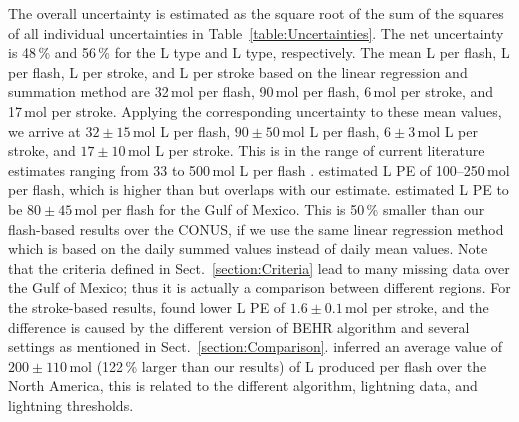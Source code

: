 \documentclass[amt]{copernicus}
\begin{document}
The overall uncertainty is estimated as the square root of the sum of the squares of all individual uncertainties in Table~\ref{table:Uncertainties}.
The net uncertainty is 48\,{\%} and 56\,{\%} for the L type and L type, respectively.
The mean L per flash, L per flash, L per stroke, and L per stroke based on the linear regression and summation method are 32\,mol per flash, 90\,mol per flash, 6\,mol per stroke, and 17\,mol per stroke.
Applying the corresponding uncertainty to these mean values, we arrive at $32 \pm 15$\,mol L per flash, $90 \pm 50$\,mol L per flash, $6 \pm 3$\,mol L per stroke, and $17 \pm 10$\,mol L per stroke.
This is in the range of current literature estimates ranging from 33 to 500\,mol L per flash \citep{Schumann.2007,Beirle.2010,Bucsela.2010}.
\citet{Bucsela.2010} estimated L PE of 100--250\,mol per flash, which is higher than but overlaps with our estimate.
\citet{Pickering.2016} estimated L PE to be $80 \pm 45$\,mol per flash for the Gulf of Mexico.
This is 50\,{\%} smaller than our flash-based results over the CONUS, if we use the same linear regression method which is based on the daily summed values instead of daily mean values.
Note that the criteria defined in Sect.~\ref{section:Criteria} lead to many missing data over the Gulf of Mexico; thus it is actually a comparison between different regions.
For the stroke-based results, \citet{Lapierre.2020} found lower L PE of $1.6 \pm 0.1$\,mol per stroke, and the difference is caused by the different version of BEHR algorithm and several settings as mentioned in Sect.~\ref{section:Comparison}.
\citet{Bucsela.2019} inferred an average value of $200 \pm 110$\,mol (122\,{\%} larger than our results) of L produced per flash over the North America, this is related to the different algorithm, lightning data, and lightning thresholds.

\conclusions \label{section:conclusions}
\end{document}
